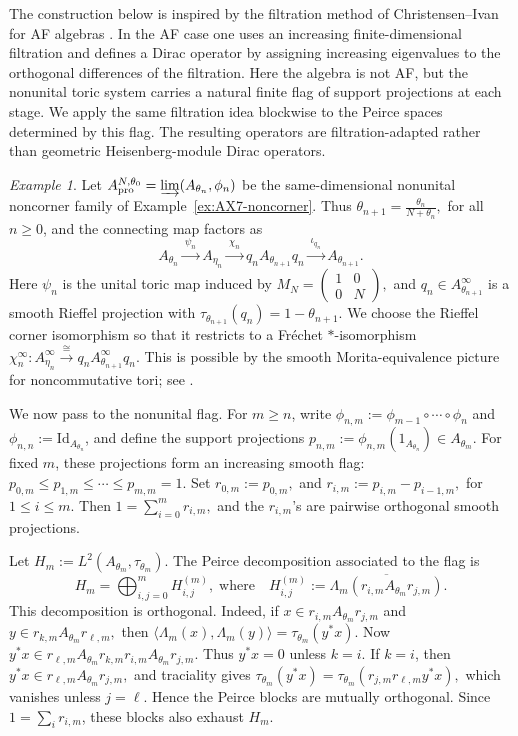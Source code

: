 \documentclass[11pt]{amsart}
\theoremstyle{definition}
\theoremstyle{remark}
\newtheorem{example}[theorem]{Example}
\newcommand{\id}{\mathrm{Id}}
\newcommand{\ex}{\mathrm{pro}}
\begin{document}
The construction below is inspired by the filtration method of
Christensen--Ivan for AF algebras \cite{ChristensenIvanAF}.  In the AF case one
uses an increasing finite-dimensional filtration and defines a Dirac operator by
assigning increasing eigenvalues to the orthogonal differences of the
filtration.  Here the algebra is not AF, but the nonunital toric system carries a
natural finite flag of support projections at each stage.  We apply the same
filtration idea blockwise to the Peirce spaces determined by this flag.  The
resulting operators are filtration-adapted rather than geometric
Heisenberg-module Dirac operators.

\begin{example}
\label{ex:AX7-flag-filtration-spectral}
Let $A_{\ex}^{N,\theta_0}=\varinjlim(A_{\theta_n},\phi_n)$
be the same-dimensional nonunital noncorner family of
Example~\ref{ex:AX7-noncorner}. Thus $\theta_{n+1}=\frac{\theta_n}{N+\theta_n},$ for all $n\ge 0$, and the connecting map factors as
\[
A_{\theta_n}
\xrightarrow{\ \psi_n\ }
A_{\eta_n}
\xrightarrow{\ \chi_n\ }
q_nA_{\theta_{n+1}}q_n
\xrightarrow{\ \iota_{q_n}\ }
A_{\theta_{n+1}}.
\]
Here $\psi_n$ is the unital toric map induced by $M_N=
\begin{pmatrix}
1&0\\
0&N
\end{pmatrix},$
and $q_n\in A_{\theta_{n+1}}^\infty$ is a smooth Rieffel projection with $\tau_{\theta_{n+1}}(q_n)=1-\theta_{n+1}.$ We choose the Rieffel corner isomorphism so that it restricts to a Fréchet
$*$-isomorphism $
\chi_n^\infty\colon A_{\eta_n}^\infty
\xrightarrow{\cong}
q_nA_{\theta_{n+1}}^\infty q_n.$ This is possible by the smooth Morita-equivalence picture for
noncommutative tori; see \cite{MR2350069}.

We now pass to the nonunital flag. For $m\ge n$, write $\phi_{n,m}:=\phi_{m-1}\circ\cdots\circ\phi_n$ and
$\phi_{n,n}:=\id_{A_{\theta_n}}$, and define the support projections $p_{n,m}:=\phi_{n,m}(1_{A_{\theta_n}})\in A_{\theta_m}.$
For fixed $m$, these projections form an increasing smooth flag:
$p_{0,m}\le p_{1,m}\le\cdots\le p_{m,m}=1.$
Set $r_{0,m}:=p_{0,m},$ and 
$r_{i,m}:=p_{i,m}-p_{i-1,m},$ for $1\le i\le m.$ Then $1=\sum_{i=0}^m r_{i,m},$
and the $r_{i,m}$'s are pairwise orthogonal smooth projections.

Let $H_m:=L^2(A_{\theta_m},\tau_{\theta_m}).$
The Peirce decomposition associated to the flag is
\[
H_m
=
\bigoplus_{i,j=0}^m H_{i,j}^{(m)},\;\text{where}
\quad
H_{i,j}^{(m)}
:=
\overline{\Lambda_m(r_{i,m}A_{\theta_m}r_{j,m})}.
\]
This decomposition is orthogonal. Indeed, if $x\in r_{i,m}A_{\theta_m}r_{j,m}$ and 
$y\in r_{k,m}A_{\theta_m}r_{\ell,m},$
then $\langle \Lambda_m(x),\Lambda_m(y)\rangle=\tau_{\theta_m}(y^*x).$ Now $y^*x
\in r_{\ell,m}A_{\theta_m}r_{k,m}r_{i,m}A_{\theta_m}r_{j,m}.$
Thus $y^*x=0$ unless $k=i$. If $k=i$, then $y^*x\in r_{\ell,m}A_{\theta_m}r_{j,m},$
and traciality gives $\tau_{\theta_m}(y^*x)=\tau_{\theta_m}(r_{j,m}r_{\ell,m}y^*x),$
which vanishes unless $j=\ell$. Hence the Peirce blocks are mutually
orthogonal. Since $1=\sum_i r_{i,m}$, these blocks also exhaust $H_m$.


\end{example}
\end{document}
